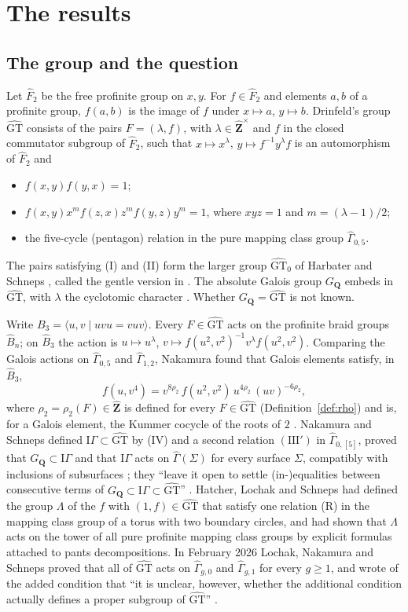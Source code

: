 \documentclass[11pt,a4paper]{article}
\theoremstyle{plain}
\theoremstyle{definition}
\theoremstyle{remark}
\newcommand{\GT}{\widehat{\mathrm{GT}}}
\newcommand{\GTz}{\widehat{\mathrm{GT}}_0}
\newcommand{\Zh}{\widehat{\mathbf Z}}
\newcommand{\GQ}{G_{\mathbf Q}}
\newcommand{\Fh}{\widehat F}
\newcommand{\Bh}{\widehat B}
\newcommand{\Gh}{\widehat\Gamma}
\begin{document}
\section{The results}

\subsection*{The group and the question}
Let $\Fh_2$ be the free profinite group on $x,y$. For $f\in\Fh_2$ and elements $a,b$ of a profinite group,
$f(a,b)$ is the image of $f$ under $x\mapsto a$, $y\mapsto b$. Drinfeld's group $\GT$ \cite{D} consists of the pairs
$F=(\lambda,f)$, with $\lambda\in\Zh^\times$ and $f$ in the closed commutator subgroup of $\Fh_2$, such that
$x\mapsto x^\lambda$, $y\mapsto f^{-1}y^\lambda f$ is an automorphism of $\Fh_2$ and
\begin{itemize}
\item[(I)] $f(x,y)f(y,x)=1$;
\item[(II)] $f(x,y)x^{m}f(z,x)z^{m}f(y,z)y^{m}=1$, where $xyz=1$ and $m=(\lambda-1)/2$;
\item[(III)] the five-cycle (pentagon) relation in the pure mapping class group $\Gh_{0,5}$.
\end{itemize}
The pairs satisfying (I) and (II) form the larger group $\GTz$ of Harbater and Schneps \cite{HS}, called the gentle
version in \cite{DG}. The absolute Galois group $\GQ$ embeds in $\GT$, with $\lambda$ the cyclotomic character
\cite{D,I}. Whether $\GQ=\GT$ is not known.

Write $B_3=\langle u,v\mid uvu=vuv\rangle$. Every $F\in\GT$ acts on the profinite braid groups $\Bh_n$; on
$\Bh_3$ the action is $u\mapsto u^\lambda$, $v\mapsto f(u^2,v^2)^{-1}v^\lambda f(u^2,v^2)$. Comparing the Galois
actions on $\Gh_{0,5}$ and $\Gh_{1,2}$, Nakamura found that Galois elements satisfy, in $\Bh_3$,
\[
 f(u,v^4)=v^{8\rho_2}\,f(u^2,v^2)\,u^{4\rho_2}\,(uv)^{-6\rho_2},\tag{IV}
\]
where $\rho_2=\rho_2(F)\in\Zh$ is defined for every $F\in\GT$ (Definition~\ref{def:rho}) and is, for a Galois
element, the Kummer cocycle of the roots of $2$ \cite[\S1 and Definition~5.1]{NS}. Nakamura and Schneps defined
$\mathrm{I}\Gamma\subset\GT$ by (IV) and a second relation $(\mathrm{III}')$ in $\Gh_{0,[5]}$, proved that
$\GQ\subset\mathrm{I}\Gamma$ and that $\mathrm{I}\Gamma$ acts on $\Gh(\Sigma)$ for every surface $\Sigma$,
compatibly with inclusions of subsurfaces \cite[Theorems 1.2--1.4]{NS}; they ``leave it open to settle
(in-)equalities between consecutive terms of $\GQ\subset\mathrm{I}\Gamma\subset\GT$'' \cite[\S1]{NS}. Hatcher,
Lochak and Schneps \cite{HLS} had defined the group $\Lambda$ of the $f$ with $(1,f)\in\GT$ that satisfy one
relation (R) in the mapping class group of a torus with two boundary circles, and had shown that $\Lambda$ acts on
the tower of all pure profinite mapping class groups by explicit formulas attached to pants decompositions. In
February 2026 Lochak, Nakamura and Schneps \cite{LNS} proved that all of $\GT$ acts on $\Gh_{g,0}$ and $\Gh_{g,1}$
for every $g\ge1$, and wrote of the added condition that ``it is unclear, however, whether the additional condition
actually defines a proper subgroup of $\GT$'' \cite[\S1]{LNS}.
\end{document}
